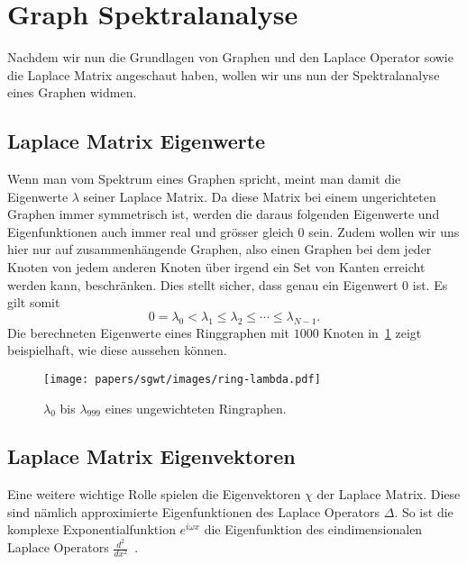 
\section{Graph Spektralanalyse\label{sec:sgwt:spectralanalysis}}

Nachdem wir nun die Grundlagen von Graphen und den Laplace Operator sowie die 
Laplace Matrix angeschaut haben, wollen wir uns nun der Spektralanalyse eines 
Graphen widmen.

\subsection{Laplace Matrix Eigenwerte}

Wenn man vom Spektrum eines Graphen spricht, meint man damit die Eigenwerte 
$\lambda$ seiner Laplace Matrix. Da diese Matrix bei einem ungerichteten 
Graphen immer symmetrisch ist, werden die daraus folgenden Eigenwerte und 
Eigenfunktionen auch immer real und gr\"osser gleich $0$ sein. Zudem wollen wir 
uns hier nur auf zusammenh\"angende Graphen, also einen Graphen bei dem jeder 
Knoten von jedem anderen Knoten \"uber irgend ein Set von Kanten erreicht 
werden kann, beschr\"anken. Dies stellt sicher, dass genau ein Eigenwert $0$ 
ist. Es gilt somit
\begin{equation}
0 = \lambda_0 < \lambda_1 \leq \lambda_2 \leq \cdots \leq \lambda_{N-1}.
\label{eq:sgwt:lambda:series}
\end{equation}
Die berechneten Eigenwerte eines Ringgraphen mit $1000$ Knoten 
in~\cref{fig:sgwt:lambda:line} zeigt beispielhaft, wie diese aussehen k\"onnen.
\begin{figure}
    \centering
    \texttt{[image: papers/sgwt/images/ring-lambda.pdf]}
    \vspace{-45pt}
    \caption{$\lambda_0$ bis $\lambda_{999}$ eines ungewichteten Ringraphen.
        \label{fig:sgwt:lambda:line}}
\end{figure}

\subsection{Laplace Matrix Eigenvektoren}

Eine weitere wichtige Rolle spielen die Eigenvektoren $\chi$ der Laplace 
Matrix. Diese sind n\"amlich approximierte Eigenfunktionen des Laplace 
Operators $\Delta$. So ist die komplexe Exponentialfunktion $e^{i\omega x}$ die 
Eigenfunktion des eindimensionalen Laplace Operators 
$\frac{d^2}{dx^2}$~\cite{chung_spectral_nodate}.

